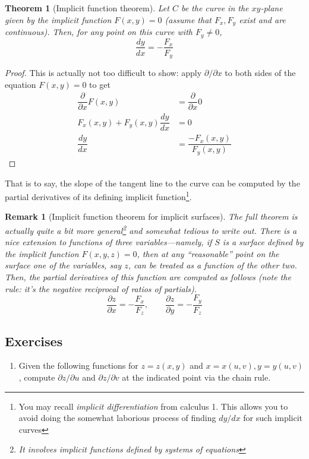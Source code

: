 \documentclass[12pt]{article}
\numberwithin{equation}{subsection}
\numberwithin{figure}{subsection}
\newtheorem{thm}[subsection]{Theorem}
\theoremstyle{note}
\newtheorem{remark}[subsection]{Remark}
\begin{document}
{\begin{thm}[Implicit function theorem] Let $C$ be the curve in the $xy$-plane given by the implicit function $F(x,y)=0$ (assume that $F_x,F_y$ exist and are continuous). Then, for any point on this curve with $F_y\neq 0$, \begin{equation} \dfrac{dy}{dx}= -\dfrac{F_x}{F_y}\label{ift}\end{equation}
\end{thm}
\begin{proof}
	This is actually not too difficult to show: apply $\partial/\partial x$ to both sides of the equation $F(x,y)=0$ to get \begin{align*}
		\dfrac{\partial}{\partial x} F(x,y)&= \dfrac{\partial}{\partial x} 0 \\
		F_x(x,y)+F_y(x,y)\dfrac{dy}{dx}&=0\\
		\dfrac{dy}{dx}&=\dfrac{-F_x(x,y)}{F_y(x,y)}
	\end{align*}
\end{proof}
That is to say, the slope of the tangent line to the curve can be computed by the partial derivatives of its defining implicit function\footnote{You may recall \textit{implicit differentiation} from calculus 1. This allows you to avoid doing the somewhat laborious process of finding $dy/dx$ for such implicit curves}. 


\begin{remark}[Implicit function theorem for implicit surfaces] The full theorem is actually quite a bit more general\footnote{It involves implicit functions defined by \textit{systems} of equations} and somewhat tedious to write out. There is a nice extension to functions of three variables---namely, if $S$ is a surface defined by the implicit function $F(x,y,z)=0$, then at any ``reasonable'' point on the surface one of the variables, say $z$, can be treated as a function of the other two. Then, the partial derivatives of this function are computed as follows (note the rule: it's the negative reciprocal of ratios of partials).  \[ \dfrac{\partial z}{\partial x}=-\dfrac{F_x}{F_z}, \qquad \dfrac{\partial z}{\partial y} = -\dfrac{F_y}{F_z} \]
\end{remark} 
\subsection{Exercises} \label{ch-rule-ex}
\begin{enumerate}[label=\arabic*.]

\item Given the following functions for $z=z(x,y)$ and $x=x(u,v), y=y(u,v)$, compute $\partial z/\partial u$ and $\partial z/\partial v$ at the indicated point via the chain rule. 


\end{enumerate}}
\end{document}
